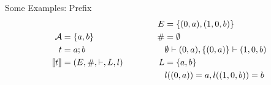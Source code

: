 \begin{frame}{Some Examples: Prefix}
    \begin{equation*}
        \begin{aligned}
            \mathcal{A} & = \{a,b\}           \\
            t           & = a;b               \\
            \llbracket t \rrbracket     & = (E,\#,\vdash,L,l) \\
        \end{aligned}
        \qquad \qquad
        \begin{aligned}
            E  & = \{(0,a),(1,0,b)\}                       \\
            \# & = \emptyset                               \\
               & \emptyset \vdash (0,a), \{(0,a)\} \vdash (1,0,b) \\
            L  & = \{a,b\}                                 \\
               & l((0,a)) = a, l((1,0,b)) = b              \\
        \end{aligned}
    \end{equation*}
    \begin{align*}
    \end{align*}
    \begin{center}
    \end{center}
\end{frame}

